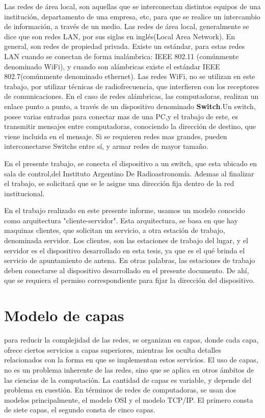 Las redes de área local, son aquellas que se interconectan distintos equipos de una institución, departamento de una empresa, etc, para que se realice un intercambio de información, a través de un medio. Las redes de área local, generalmente se dice que son redes LAN, por sus siglas en inglés(Local Area Network).  En general, son redes de propiedad privada. Existe un estándar, para estas redes LAN cuando se conectan de forma inalámbrica: IEEE 802.11 (comúnmente denominado WiFi), y cuando son alámbricas existe el estándar IEEE 802.7(comúnmente denominado ethernet). Las redes WiFi, no se utilizan en este trabajo, por utilizar técnicas de radiofrecuencia, que interfieren con los receptores de comunicaciones.  
En el caso de redes alámbricas, las computadoras, realizan un enlace punto a punto, a través de un dispositivo denominado \textbf{Switch}.Un switch, posee varias entradas para conectar mas de una PC,y el trabajo de este, es transmitir mensajes entre computadoras, conociendo la dirección de destino, que viene incluida en el mensaje. Si se requieren redes mas grandes, pueden interconectarse Switchs entre sí, y armar redes de mayor tamaño. 


En el presente trabajo, se conecta el dispositivo a un switch, que esta ubicado en sala de control,del Instituto Argentino De Radioastronomía. Ademas al finalizar el trabajo, se solicitará que se le asigne una dirección fija dentro de la red institucional.  

En el trabajo realizado en este presente informe, usamos un modelo conocido como arquitectura "cliente-servidor". Esta arquitectura, se basa en que hay maquinas clientes, que solicitan un servicio, a otra estación de trabajo, denominada servidor. Los clientes, son las estaciones de trabajo del lugar, y el servidor es el dispositivo desarrollado en esta tesis, ya que es el qué brinda el servicio de apuntamiento de antena. En otras palabras, las estaciones de trabajo deben conectarse al dispositivo desarrollado en el presente documento. De ahí, que se requiera el permiso correspondiente para fijar la dirección del dispositivo.  




\section{Modelo de capas}

para reducir la complejidad de las redes, se organizan en capas, donde cada capa, ofrece ciertos servicios a capas superiores, mientras les oculta detalles relacionados con la forma en que se implementan estos servicios. El uso de capas, no es un problema inherente de las redes, sino que se aplica en otros ámbitos de las ciencias de la computación. La cantidad de capas es variable, y depende del problema en cuestión. En términos de redes de computadoras, se usan dos modelos principalmente, el modelo OSI y el modelo TCP/IP. El primero consta de siete capas, el segundo consta de cinco capas. 

